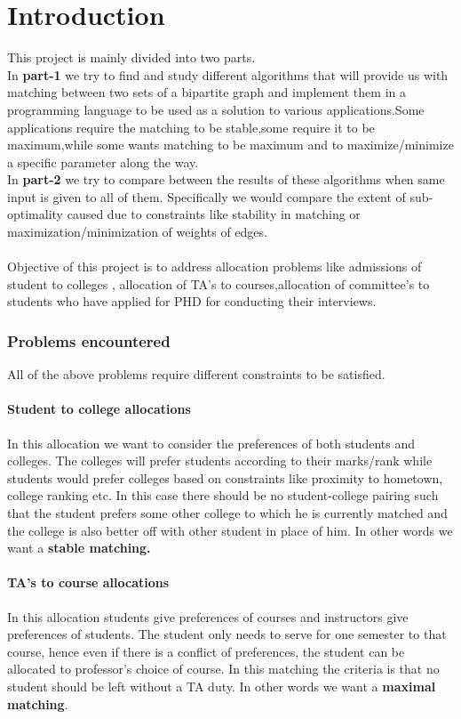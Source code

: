 \documentclass[a4paper]{report}
\theoremstyle{definition}
\begin{document}
\tableofcontents
\chapter{Introduction}
This project is mainly divided into two parts.\\

In \textbf{part-1} we try to find and study different algorithms that will provide us with matching between two sets of a bipartite graph and implement them in a programming language to be used as a solution to various applications.Some applications require the matching to be stable,some require it to be maximum,while some wants matching to be maximum and to maximize/minimize a specific parameter along the way.\\

In \textbf{part-2} we try to compare between the results of these algorithms when same input is given to all of them. Specifically we would compare the extent of sub-optimality caused due to constraints like stability in matching or maximization/minimization of weights of edges.\\\\
Objective of this project is to address allocation problems like admissions of student to colleges , allocation of TA's to courses,allocation of committee's to students who have applied for PHD
for conducting their interviews.
\subsection{Problems encountered}

All of the above problems require different constraints to be satisfied.
\subsubsection{Student to college allocations }
In this allocation we want to consider the preferences of both students and colleges. The colleges will prefer students according to their marks/rank while students would prefer colleges based on constraints like proximity to hometown, college ranking etc. In this case there should be no student-college pairing such that the student prefers some other college to which he is currently matched and the college is also better off with other student in place of him. In other words we want a \textbf{stable matching.}

\subsubsection{TA's to course allocations}
 In this allocation students give preferences of courses and instructors give preferences of students. The student only needs to serve for one semester to that course, hence even if there is a conflict of preferences, the student can be allocated to professor's choice of course. In this matching the criteria is that no student should be left without a TA duty. In other words we want a \textbf{maximal matching}.
\end{document}
